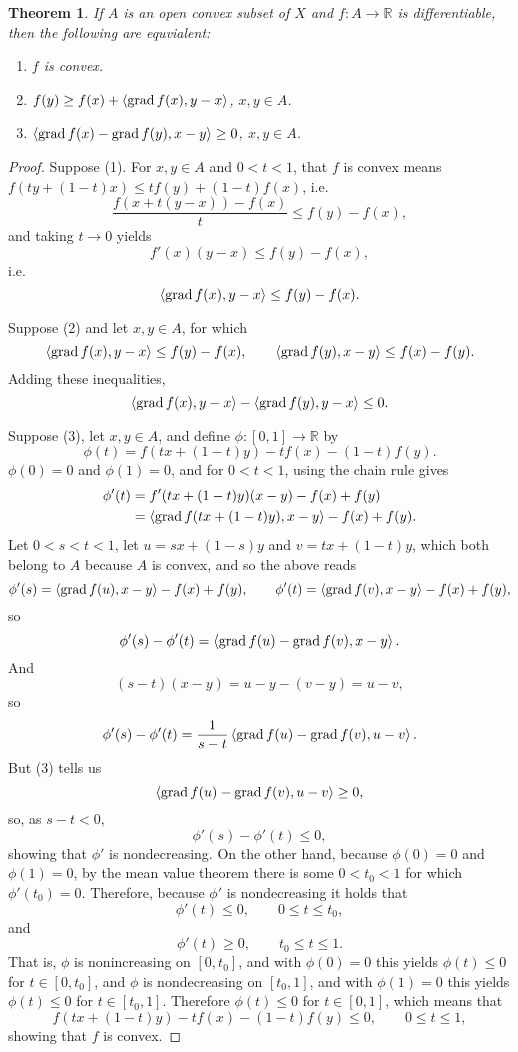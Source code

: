 \documentclass{article}
\newcommand{\inner}[2]{\left\langle #1, #2 \right\rangle}
\newcommand{\grad}{\ensuremath\mathrm{grad}\,}
\newtheorem{theorem}{Theorem}
\theoremstyle{definition}
\begin{document}
\begin{theorem}
If $A$ is an open convex subset of $X$ and $f:A \to \mathbb{R}$ is  differentiable, then the following are
equvialent:
\begin{enumerate}
\item $f$ is convex.
\item $f(y) \geq f(x)+\inner{\grad f(x)}{y-x}$, $x,y \in A$.
\item $\inner{\grad f(x)-\grad f(y)}{x-y} \geq 0$, $x,y \in A$.
\end{enumerate}
\label{convex1}
\end{theorem}
\begin{proof}
Suppose (1). For $x,y \in A$ and $0<t<1$, that $f$ is convex means 
$f(t y + (1-t)x) \leq t f(y)+(1-t)f(x)$, i.e.
\[
\frac{f(x+t(y-x))-f(x)}{t} \leq f(y)-f(x),
\]
and taking $t \to 0$ yields 
\[
f'(x)(y-x) \leq f(y)-f(x),
\]
i.e.
\[
\inner{\grad f(x)}{y-x} \leq f(y)-f(x).
\]

Suppose (2) and let $x,y \in A$, for which
\[
\inner{\grad f(x)}{y-x} \leq f(y)-f(x), \qquad \inner{\grad f(y)}{x-y} \leq f(x)-f(y).
\]
Adding these inequalities,
\[
\inner{\grad f(x)}{y-x}- \inner{\grad f(y)}{y-x}\leq 0.
\]

Suppose (3), let $x,y \in A$, and define $\phi:[0,1] \to \mathbb{R}$ by
\[
\phi(t) = f(tx+(1-t)y)-tf(x)-(1-t)f(y).
\] 
$\phi(0)=0$ and $\phi(1)=0$, and for $0<t<1$, using the chain rule gives
\begin{align*}
\phi'(t) &=  f'(tx+(1-t)y)(x-y)-f(x)+f(y)\\
&=\inner{\grad f(tx+(1-t)y)}{x-y}-f(x)+f(y).
\end{align*}
Let $0<s<t<1$, let $u=sx+(1-s)y$ and $v=tx+(1-t)y$, which both belong to $A$ because $A$ is convex,
and so the above reads
\[
\phi'(s) = \inner{\grad f(u)}{x-y}-f(x)+f(y), \qquad \phi'(t) = \inner{\grad f(v)}{x-y}-f(x)+f(y),
\]
so
\[
\phi'(s)-\phi'(t) = \inner{\grad f(u)-\grad f(v)}{x-y}.
\]
And
\[
(s-t)(x-y) =u-y -(v-y) = u-v, 
\]
so
\[
\phi'(s)-\phi'(t) = \frac{1}{s-t} \inner{\grad f(u)-\grad f(v)}{u-v}.
\]
But
(3) tells us
\[
\inner{\grad f(u)-\grad f(v)}{u-v} \geq 0, 
\]
so, as $s-t <0$,
\[
\phi'(s)-\phi'(t) \leq 0,
\]
showing that $\phi'$ is nondecreasing. 
On the other hand, because $\phi(0)=0$ and $\phi(1)=0$, by the mean value theorem there is some
$0<t_0<1$ for which $\phi'(t_0)=0$.
Therefore, because $\phi'$ is nondecreasing it holds that
\[
\phi'(t) \leq 0, \qquad 0 \leq t \leq t_0,
\]
and 
\[
\phi'(t) \geq 0,\qquad t_0 \leq t \leq 1.
\]
That is, $\phi$ is nonincreasing on $[0,t_0]$, and with $\phi(0)=0$ this yields 
$\phi(t) \leq 0$ for $t \in [0,t_0]$, and
$\phi$ is nondecreasing on $[t_0,1]$, and with $\phi(1)=0$ this yields
$\phi(t) \leq 0$ for $t \in [t_0,1]$.  Therefore $\phi(t) \leq 0$ for $t \in [0,1]$, which means that
\[
f(tx+(1-t)y)-tf(x)-(1-t)f(y) \leq 0, \qquad 0 \leq t \leq 1,
\]
showing that $f$ is convex.
\end{proof}
\end{document}
